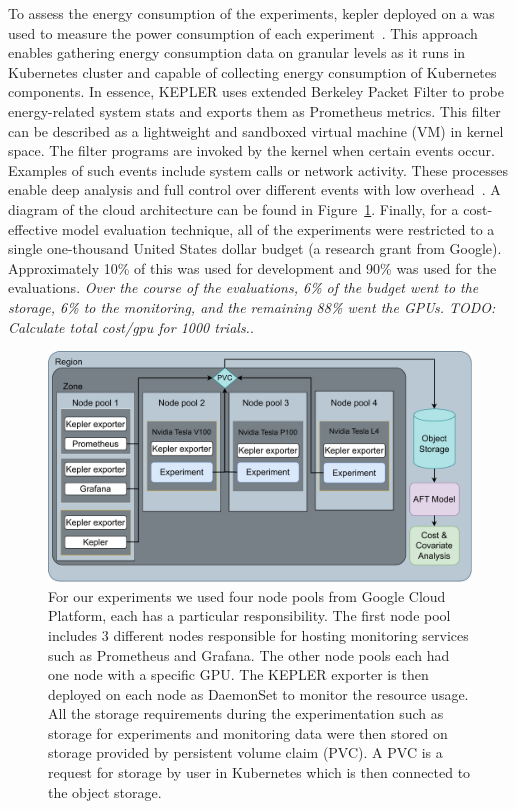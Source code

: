 \documentclass[conference]{IEEEtran}
\newcommand{\cm}[1]{\textit{{\color{blue}#1}}}
\begin{document}
To assess the energy consumption of the experiments, \Gls{kepler} deployed on a was used to measure the power consumption of each experiment~\cite{amaral2023kepler}. This approach enables gathering energy consumption data on granular levels as it runs in Kubernetes cluster and capable of collecting energy consumption of Kubernetes components. In essence, KEPLER uses extended Berkeley Packet Filter to probe energy-related system stats and exports them as Prometheus metrics. This filter can be described as a lightweight and sandboxed virtual machine (VM) in kernel space. The filter programs are invoked by the kernel when certain events occur. Examples of such events include system calls or network activity. These processes enable deep analysis and full control over different events with low overhead~\cite{sedghpour@ebpf}. A diagram of the cloud architecture can be found in Figure~\ref{fig:architecture}. Finally, for a cost-effective model evaluation technique, all of the experiments were restricted to a single one-thousand United States dollar budget (a research grant from Google). Approximately 10\% of this was used for development and 90\% was used for the evaluations.
\cm{Over the course of the evaluations, 6\% of the budget went to the storage, 6\% to the monitoring, and the remaining 88\% went the GPUs. TODO: Calculate total cost/gpu for 1000 trials.}.

\begin{figure}
    \centering
    \includegraphics[width=.9\textwidth]{plots/architecture.pdf}
    \caption{For our experiments we used four node pools from Google Cloud Platform, each has a particular responsibility. The first node pool includes 3 different nodes responsible for hosting monitoring services such as Prometheus and Grafana.  The other node pools each had one node with a specific GPU.  The KEPLER exporter is then deployed on each node as DaemonSet to monitor the resource usage.  All the storage requirements during the experimentation such as storage for experiments and monitoring data were then stored on storage provided by persistent volume claim (PVC). A PVC is a request for storage by user in Kubernetes which is then connected to the object storage.}
    \label{fig:architecture}
\end{figure}
\end{document}
